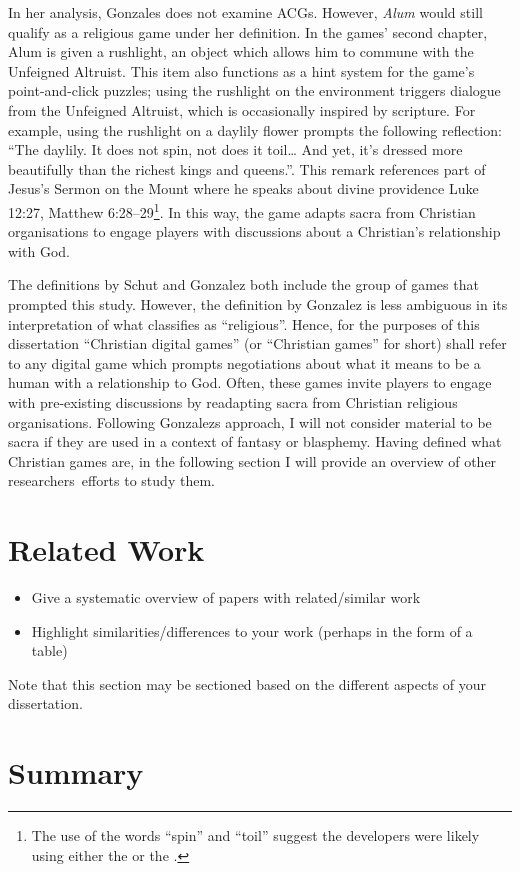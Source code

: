 
In her analysis, Gonzales does not examine \acp{ACG}. However, \textit{Alum} would still qualify as a religious game under her definition. In the games' second chapter, Alum is given a rushlight, an object which allows him to commune with the Unfeigned Altruist. This item also functions as a hint system for the game's point-and-click puzzles; using the rushlight on the environment triggers dialogue from the Unfeigned Altruist, which is occasionally inspired by scripture. For example, using the rushlight on a daylily flower prompts the following reflection: ``The daylily. It does not spin, not does it toil… And yet, it’s dressed more beautifully than the richest kings and queens.''. This remark references part of Jesus's Sermon on the Mount where he speaks about divine providence Luke 12:27, Matthew 6:28–29\footnote{The use of the words ``spin'' and ``toil'' suggest the developers were likely using either the \textcite{noauthor_english_2001} or the \textcite{noauthor_king_1769}.}. In this way, the game adapts sacra from Christian organisations to engage players with discussions about a Christian's relationship with God.

The definitions by Schut and Gonzalez both include the group of games that prompted this study. However, the definition by Gonzalez is less ambiguous in its interpretation of what classifies as ``religious''. Hence, for the purposes of this dissertation ``Christian digital games'' (or ``Christian games'' for short) shall refer to any digital game which prompts negotiations about what it means to be a human with a relationship to God. Often, these games invite players to engage with pre-existing discussions by readapting sacra from Christian religious organisations.  Following Gonzalez\textquotesingle s approach, I will not consider material to be sacra if they are used in a context of fantasy or blasphemy. Having defined what Christian games are, in the following section I will provide an overview of other researchers\textquotesingle \  efforts to study them.
\section{Related Work}

  \begin{itemize}
   \item Give a systematic overview of papers with related/similar work
   \item Highlight similarities/differences to your work (perhaps in the form of a table)
  \end{itemize}

  Note that this section may be sectioned based on the different aspects of your dissertation.
\fi

\section{Summary}
\blindtext
